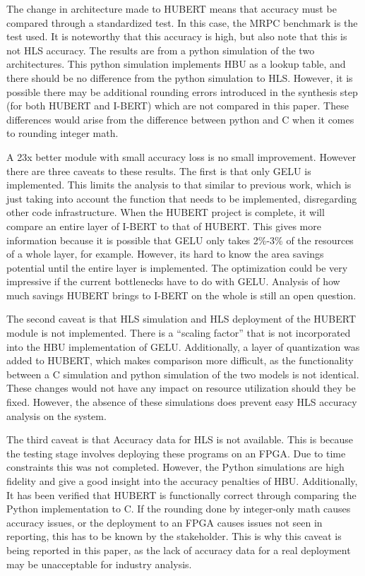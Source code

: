 \documentclass[12pt]{article}
\begin{document}
	The change in architecture made to HUBERT means that accuracy must be compared through a standardized test. In this case, the MRPC benchmark is the test used. It is noteworthy that this accuracy is high, but also note that this is not HLS accuracy. The results are from a python simulation of the two architectures. This python simulation implements HBU as a lookup table, and there should be no difference from the python simulation to HLS. However, it is possible there may be additional rounding errors introduced in the synthesis step (for both HUBERT and I-BERT) which are not compared in this paper. These differences would arise from the difference between python and C when it comes to rounding integer math.
	
	A 23x better module with small accuracy loss is no small improvement. However there are three caveats to these results.
	The first is that only GELU is implemented. This limits the analysis to that similar to previous work, which is just taking into account the function that needs to be implemented, disregarding other code infrastructure. When the HUBERT project is complete, it will compare an entire layer of I-BERT to that of HUBERT. This gives more information because it is possible that GELU only takes 2\%-3\% of the resources of a whole layer, for example. However, its hard to know the area savings potential until the entire layer is implemented. The optimization could be very impressive if the current bottlenecks have to do with GELU. Analysis of how much savings HUBERT brings to I-BERT on the whole is still an open question. 
	
	The second caveat is that HLS simulation and HLS deployment of the HUBERT module is not implemented. There is a “scaling factor” that is not incorporated into the HBU implementation of GELU. Additionally, a layer of quantization was added to HUBERT, which makes comparison more difficult, as the functionality between a C simulation and python simulation of the two models is not identical. These changes would not have any impact on resource utilization should they be fixed. However, the absence of these simulations does prevent easy HLS accuracy analysis on the system. 
	
	The third caveat is that Accuracy data for HLS is not available. This is because the testing stage involves deploying these programs on an FPGA. Due to time constraints this was not completed. However, the Python simulations are high fidelity and give a good insight into the accuracy penalties of HBU. Additionally, It has been verified that HUBERT is functionally correct through comparing the Python implementation to C. If the rounding done by integer-only math causes accuracy issues, or the deployment to an FPGA causes issues not seen in reporting, this has to be known by the stakeholder. This is why this caveat is being reported in this paper, as the lack of accuracy data for a real deployment may be unacceptable for industry analysis.
	
\end{document}
